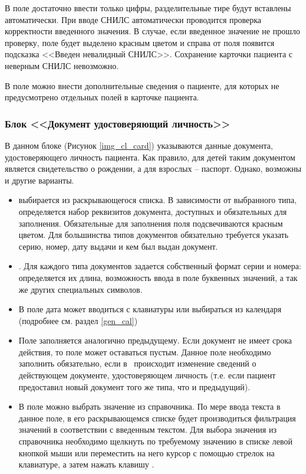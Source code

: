 {В поле  достаточно ввести только цифры, разделительные тире будут вставлены автоматически. При вводе СНИЛС автоматически проводится проверка корректности введенного значения. В случае, если введенное значение не прошло проверку, поле будет выделено красным цветом и справа от поля появится подсказка <<Введен невалидный СНИЛС>>. Сохранение карточки пациента с неверным СНИЛС невозможно.

В поле  можно внести дополнительные сведения о пациенте, для которых не предусмотрено отдельных полей в карточке пациента. 
 
\subsubsection{Блок <<Документ удостоверяющий личность>>}

В данном блоке (Рисунок \ref{img_cl_card}) указываются данные документа, удостоверяющего личность пациента. Как правило, для детей таким документом является свидетельство о рождении, а для взрослых – паспорт. Однако, возможны и другие варианты. 
\begin{itemize}
 \item {} выбирается из раскрывающегося списка. В зависимости от выбранного типа, определяется набор реквизитов документа, доступных и обязательных для  заполнения. Обязательные для заполнения поля подсвечиваются красным цветом. Для большинства типов документов обязательно требуется указать серию, номер, дату выдачи и кем был выдан документ. 
 \item {}. Для каждого типа документов задается собственный формат серии и номера: определяется их длина,  возможность ввода в поле буквенных значений, а так же других специальных символов. 
 \item В поле  дата может вводиться с клавиатуры или выбираться из календаря (подробнее см. раздел \ref{gen_cal}) 
 \item Поле  заполняется аналогично предыдущему. Если документ не имеет срока действия, то поле может оставаться пустым. Данное поле необходимо заполнить обязательно, если в \tmis~происходит изменение сведений о действующем документе, удостоверяющем личность (т.е. если пациент предоставил новый документ того же типа, что и предыдущий). 
 \item В поле  можно выбрать значение из справочника. %
 По мере ввода текста в данное поле, в его  раскрывающемся списке будет производиться фильтрация значений в соответствии с введенным текстом. Для выбора значения из справочника необходимо щелкнуть по требуемому значению в списке левой кнопкой мыши или переместить на него курсор с помощью стрелок на клавиатуре, а затем нажать клавишу . %
\end{itemize}

}
